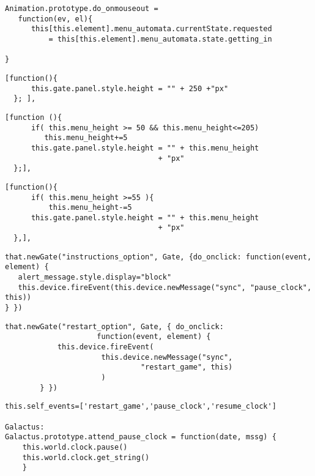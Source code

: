 \begin{lstlisting}[caption=Clase Button, label={lst:code5123}]
Animation.prototype.do_onmouseout = 
   function(ev, el){
      this[this.element].menu_automata.currentState.requested 
          = this[this.element].menu_automata.state.getting_in

}
\end{lstlisting}


\begin{lstlisting}[caption=Estado out, label={lst:code5211}]
  [function(){
      this.gate.panel.style.height = "" + 250 +"px" 
  }; ],
\end{lstlisting}


\begin{lstlisting}[caption=Estado getting\_out, label={lst:code5212}]
  [function (){
      if( this.menu_height >= 50 && this.menu_height<=205)
         this.menu_height+=5
      this.gate.panel.style.height = "" + this.menu_height 
                                   + "px"
  };],
\end{lstlisting}


\begin{lstlisting}[caption=Estado getting\_in, label={lst:code5213}]
  [function(){
      if( this.menu_height >=55 ){         
          this.menu_height-=5
      this.gate.panel.style.height = "" + this.menu_height 
                                   + "px"
  },],
\end{lstlisting}

\begin{lstlisting}[caption=Instructions\_option Gate, label={lst:code5221}]
that.newGate("instructions_option", Gate, {do_onclick: function(event, element) {
   alert_message.style.display="block"
   this.device.fireEvent(this.device.newMessage("sync", "pause_clock", this))
} })
\end{lstlisting}

\begin{lstlisting}[caption=restart\_option, label={lst:code5222}]
 that.newGate("restart_option", Gate, { do_onclick: 
                     function(event, element) {
            this.device.fireEvent(
                      this.device.newMessage("sync", 
                               "restart_game", this)
                      )
        } })
\end{lstlisting}


\begin{lstlisting}[caption=Variable self\_events, label={lst:code5231}]
this.self_events=['restart_game','pause_clock','resume_clock']

Galactus:
Galactus.prototype.attend_pause_clock = function(date, mssg) {
    this.world.clock.pause()
    this.world.clock.get_string()
    }
\end{lstlisting}

